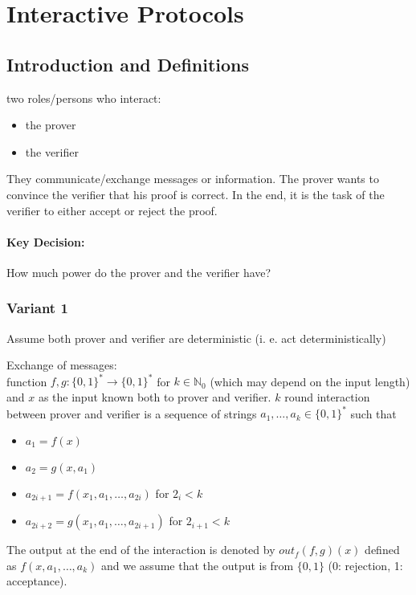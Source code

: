 \documentclass[11pt]{article}
\theoremstyle{definition}
\theoremstyle{definition}
\begin{document}
\section{Interactive Protocols}

\subsection{Introduction and Definitions}

two roles/persons who interact:
\begin{itemize}
\item the prover
\item the verifier
\end{itemize}

They communicate/exchange messages or information. The prover wants to convince the verifier that his proof is correct. In the end, it is the task of the verifier to either accept or reject the proof.

\paragraph{Key Decision:} How much power do the prover and the verifier have?

\subsubsection{Variant 1}
Assume both prover and verifier are deterministic (i. e. act deterministically)
	
Exchange of messages: \\ function $ f, g : \{ 0, 1 \}^\ast \rightarrow \{ 0,1\}^\ast $ for $ k \in \mathbb{N}_0 $ (which may depend on the input length) and $ x $ as the input known both to prover and verifier. $ k $ round interaction between prover and verifier is a sequence of strings $ a_1, \dots, a_k \in \{0, 1\}^\ast $ such that
\begin{itemize}
	\item $ a_1 = f(x) $
	\item $ a_2 = g(x, a_1) $
	\item $ a_{2i + 1} = f(x_1, a_1, \dots, a_{2i}) $ for $ 2_i < k $
	\item $ a_{2i + 2} = g(x_1, a_1, \dots, a_{2i + 1}) $ for $ 2_{i + 1} < k $
\end{itemize}
	
The output at the end of the interaction is denoted by $ out_f (f, g)(x) $ defined as $ f(x, a_1, \dots, a_k) $ and we assume that the output is from $ \{ 0, 1 \} $ (0: rejection, 1: acceptance).
	
\end{document}

